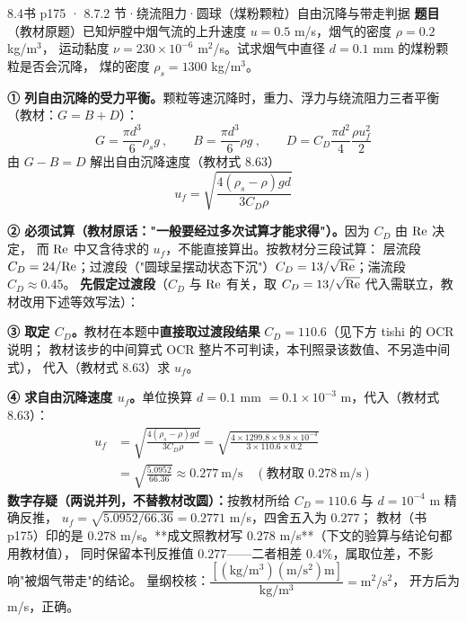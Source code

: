 \begin{liti}{8.4}{书 p175 · 8.7.2 节·绕流阻力·圆球（煤粉颗粒）自由沉降与带走判据}
\textbf{题目}（教材原题）已知炉膛中烟气流的上升速度 $u=0.5$ m/s，烟气的密度 $\rho=0.2$ kg/m$^3$，
运动黏度 $\nu=230\times10^{-6}$ m$^2$/s。试求烟气中直径 $d=0.1$ mm 的煤粉颗粒是否会沉降，
煤的密度 $\rho_s=1300$ kg/m$^3$。


\begin{jie}
\textbf{① 列自由沉降的受力平衡。}颗粒等速沉降时，重力、浮力与绕流阻力三者平衡（教材：$G=B+D$）：
\[ G=\frac{\pi d^3}{6}\rho_sg\ ,\qquad B=\frac{\pi d^3}{6}\rho g\ ,\qquad
   D=C_D\frac{\pi d^2}{4}\frac{\rho u_f^2}{2} \]
由 $G-B=D$ 解出自由沉降速度（教材式 8.63）
\[ u_f=\sqrt{\frac{4(\rho_s-\rho)gd}{3C_D\rho}} \]

\textbf{② 必须试算（教材原话："一般要经过多次试算才能求得"）。}因为 $C_D$ 由 $\mathrm{Re}$ 决定，
而 $\mathrm{Re}$ 中又含待求的 $u_f$，不能直接算出。按教材分三段试算：
层流段 $C_D=24/\mathrm{Re}$；过渡段（"圆球呈摆动状态下沉"）$C_D=13/\sqrt{\mathrm{Re}}$；湍流段 $C_D\approx0.45$。
\textbf{先假定过渡段}（$C_D$ 与 $\mathrm{Re}$ 有关，取 $C_D=13/\sqrt{\mathrm{Re}}$ 代入需联立，教材改用下述等效写法）：

\textbf{③ 取定 $C_D$。}教材在本题中\textbf{直接取过渡段结果} $C_D=110.6$（见下方 tishi 的 OCR 说明；
教材该步的中间算式 OCR 整片不可判读，本刊照录该数值、不另造中间式），
代入（教材式 8.63）求 $u_f$。

\textbf{④ 求自由沉降速度 $u_f$。}单位换算 $d=0.1$ mm $=0.1\times10^{-3}$ m，代入（教材式 8.63）：
\[ \begin{aligned}
   u_f&=\sqrt{\frac{4(\rho_s-\rho)gd}{3C_D\rho}}
       =\sqrt{\frac{4\times1299.8\times9.8\times10^{-4}}{3\times110.6\times0.2}}\\
   &=\sqrt{\frac{5.0952}{66.36}}\approx0.277\ \mathrm{m/s}
   \quad(\text{教材取 }0.278\ \mathrm{m/s})
   \end{aligned} \]
\textbf{数字存疑（两说并列，不替教材改圆）：}按教材所给 $C_D=110.6$ 与 $d=10^{-4}$ m 精确反推，
$u_f=\sqrt{5.0952/66.36}=0.2771$ m/s，四舍五入为 $0.277$；
教材（书 p175）印的是 $0.278$ m/s。**成文照教材写 $0.278$ m/s**（下文的验算与结论句都用教材值），
同时保留本刊反推值 $0.277$——二者相差 $0.4\%$，属取位差，不影响"被烟气带走"的结论。
量纲校核：$\dfrac{[(\mathrm{kg/m^3})(\mathrm{m/s^2})\mathrm m]}{\mathrm{kg/m^3}}=\mathrm{m^2/s^2}$，
开方后为 m/s，正确。


\end{jie}
\end{liti}
